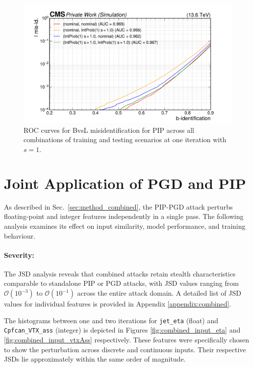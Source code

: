 \begin{figure}[h]
\centering
    \includegraphics[width=12cm]{media/output/roc_bvsl_intprob_permutations.pdf}
    \caption{ROC curves for BvsL misidentification for PIP across all combinations of training and testing scenarios at one iteration with $s=1$.}
    \label{fig:intprob_rocs_training}
\end{figure}


\section{Joint Application of PGD and PIP}

As described in Sec.~\ref{sec:method_combined}, the PIP-PGD attack perturbs floating-point and integer features independently in a single pass. The following analysis examines its effect on input similarity, model performance, and training behaviour.


\paragraph{Severity:} The JSD analysis reveals that combined attacks retain stealth characteristics comparable to standalone PIP or PGD attacks, with JSD values ranging from $\mathcal{O}(10^{-3})$ to $\mathcal{O}(10^{-1})$ across the entire attack domain. A detailed list of JSD values for individual features is provided in Appendix \ref{appendix:combined}.

The histograms between one and two iterations for \texttt{jet\_eta} (float) and \texttt{Cpfcan\_VTX\_ass} (integer) is depicted in Figures \ref{fig:combined_input_eta} and \ref{fig:combined_input_vtxAss} respectively. These features were specifically chosen to show the perturbation across discrete and continuous inputs. Their respective JSDs lie approximately within the same order of magnitude.


